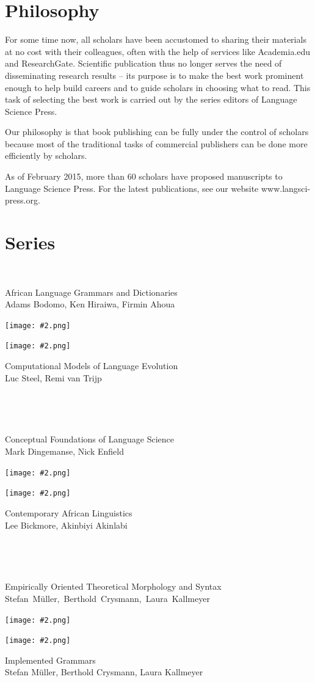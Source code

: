 \documentclass[
notumble,
nofoldmark,
]{leaflet}
\begin{document}
 \section{\sffamily\Large Philosophy}
 \parbox{\textwidth}{
 For some time now, all scholars have been accustomed to sharing their materials at no cost with their colleagues, often with the help of services like Academia.edu and ResearchGate. Scientific publication thus no longer serves the need of disseminating research results -- its purpose is to make the best work prominent enough to help build careers and to guide scholars in choosing what to read. This task of selecting the best work is carried out by the series editors of Language Science Press.

 Our philosophy is that book publishing can be fully under the control of scholars because most of the traditional tasks of commercial publishers can be done more efficiently by scholars. 
 
As of February 2015, more than 60 scholars have proposed manuscripts to Language Science Press. For the latest publications, see our website www.langsci-press.org.
 }
\newpage 

\section{\sffamily\Large Series}

\newcommand{\leftseries}[3]{   
  \parbox{.1\textwidth}{~}
  \parbox{.7\textwidth}{\raggedleft\small #1\\{\scriptsize #3}}
  \parbox{.1\textwidth}{\texttt{[image: \#2.png]}} 
}

\newcommand{\rightseries}[3]{   
  \parbox{.1\textwidth}{\texttt{[image: \#2.png]}}
  \parbox{.7\textwidth}{\raggedright\small #1\\{\scriptsize #3}}
  \parbox{.1\textwidth}{~} 
}

\leftseries{African Language Grammars and Dictionaries}{algad}{Adams Bodomo, Ken Hiraiwa, Firmin Ahoua}
\rightseries{Computational Models of Language Evolution}{cmle}{Luc Steel, Remi van Trijp}

\leftseries{Conceptual Foundations of Language Science}{cfls}{Mark Dingemanse, Nick Enfield}
\rightseries{Contemporary African Linguistics}{cal}{Lee Bickmore, Akinbiyi Akinlabi}

\leftseries{Empirically Oriented Theoretical Morphology and Syntax}{eotms}{\mbox{Stefan M\"uller, Berthold Crysmann, Laura Kallmeyer}}
\rightseries{Implemented Grammars}{eotms-ig}{Stefan M\"uller, Berthold Crysmann, Laura Kallmeyer}
\end{document}
